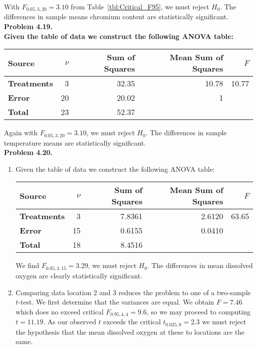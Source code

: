 With $F_{0.05,3,20} = 3.10$ from Table~\ref{tbl:Critical_F95}, we must reject $H_0$.
The differences in sample means chromium content are statistically significant.
\\

\noindent
\bf{Problem 4.19.} \\

Given the table of data we construct the following ANOVA table:
\begin{table}[H]
\centering
\begin{tabular}{|l|r|r|r|r|} \hline
\bf{Source} & $\nu$ & \bf{Sum of Squares} & \bf{Mean Sum of Squares} & $F$ \\ \hline
\bf{Treatments} & 3 & 32.35 & 10.78 &  10.77 \\ \hline
\bf{Error} & 20 & 20.02 & 1 &  \\ \hline
\bf{Total} & 23 & 52.37 &  &  \\ \hline
\end{tabular}
\end{table}

Again with $F_{0.05,3,20} = 3.10$, we must reject $H_0$.  The differences in sample temperature means are
statistically significant.
\\

\noindent
\bf{Problem 4.20.} \\

\begin{enumerate}[label=\alph*)]
\item Given the table of data we construct the following ANOVA table:
\begin{table}[H]
\centering
\begin{tabular}{|l|r|r|r|r|} \hline
\bf{Source} & $\nu$ & \bf{Sum of Squares} & \bf{Mean Sum of Squares} & $F$ \\ \hline
\bf{Treatments} & 3 & 7.8361 & 2.6120 &  63.65 \\ \hline
\bf{Error} & 15 & 0.6155 & 0.0410 &  \\ \hline
\bf{Total} & 18 & 8.4516 &  &  \\ \hline
\end{tabular}
\end{table}
We find $F_{0.05,3,15} = 3.29$, we must reject $H_0$.  The differences in mean dissolved oxygen are
clearly statistically significant.

\item Comparing data location 2 and 3 reduces the problem to one of a two-sample $t$-test.  We
first determine that the variances are equal.  We obtain $F = 7.46$ which does no exceed critical
$F_{0.95,4,4} = 9.6$, so we may proceed to computing $t = 11.19$.  As our observed $t$ exceeds
the critical $t_{0.025,8} = 2.3$ we must reject the hypothesis that the mean dissolved oxygen at
these to locations are the same.
\end{enumerate}

